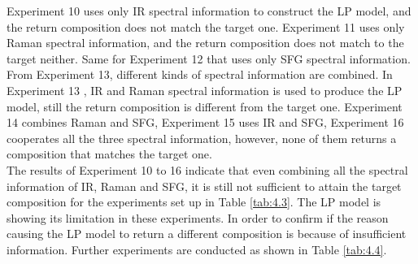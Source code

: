 Experiment 10 uses only IR spectral information to construct the LP model, and the return composition does not match the target one. Experiment 11 uses only Raman spectral information, and the return composition does not match to the target neither. Same for Experiment 12 that uses only SFG spectral information. From Experiment 13, different kinds of spectral information are combined. In Experiment 13 , IR and Raman spectral information is used to produce the LP model, still the return composition is different from the target one. Experiment 14 combines Raman and SFG, Experiment 15 uses IR and SFG, Experiment 16 cooperates all the three spectral information, however, none of them returns a composition that matches the target one. \\

The results of Experiment 10 to 16 indicate that even combining all the spectral information of IR, Raman and SFG, it is still not sufficient to attain the target composition for the experiments set up in Table \ref{tab:4.3}. The LP model is showing its limitation in these experiments. In order to confirm if the reason causing the LP model to return a different composition is because of insufficient information. Further experiments are conducted as shown in Table \ref{tab:4.4}. \\

